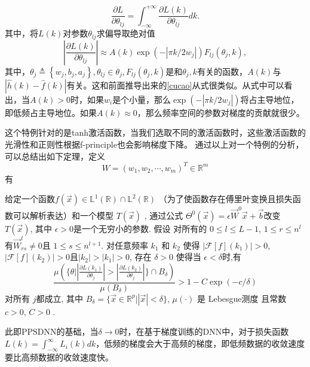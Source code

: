 \begin{equation}
    \frac{\partial L}{\partial\theta_{lj}}=\int_{-\infty}^{+\infty}\frac{\partial L(k)}{\partial\theta_{lj}}dk.\label{eq:GDfreq}
\end{equation}
其中，将$L(k)$对参数$\theta_{lj}$求偏导取绝对值
\begin{equation}
    \left|\frac{\partial L(k)}{\partial\theta_{lj}}\right|\approx A(k)\exp\left(-|\pi k/2w_{j}|\right)F_{lj}(\theta_{j},k),\label{eq:DL2}
\end{equation}
其中，$\theta_{j} \triangleq\left\{w_{j}, b_{j}, a_{j}\right\}, \theta_{l j} \in \theta_{j}, F_{l j}\left(\theta_{j}, k\right)$是和$\theta_{j}, k$有关的函数，$A(k)$与$|\hat{h}(k)-\hat{f}(k)|$有关。这和前面推导出来的\ref{cucao}从式很类似。从式中可以看出，当$A(k)>0$时，如果$w_{i}$是个小量，那么$\exp\left(-|\pi k/2w_{j}|\right)$将占主导地位，即低频占主导地位。如果$A(k)\approx 0$，那么频率空间的参数对梯度的贡献就很少。

这个特例针对的是tanh激活函数，当我们选取不同的激活函数时，这些激活函数的光滑性和正则性根据f-principle也会影响梯度下降。
通过以上对一个特例的分析，可以总结出如下定理，定义
\begin{equation}
    W=\left(w_{1}, w_{2}, \cdots, w_{m}\right)^{T} \in \mathbb{R}^{m}
\end{equation}
有
\begin{thm}
给定一个函数$f(\vec{x})\in\mathbb{L}^{1}(\mathbb{R})\cap\mathbb{L}%
^{2}(\mathbb{R})$ （为了使函数存在傅里叶变换且损失函数可以解析表达）和一个模型 $T(\vec{x})$ , 通过公式 $\Theta^{0}(\vec{x})=\epsilon
\vec{W}^{0}\vec{x}+\vec{b}$改变 $T(\vec{x})$, 其中 $\epsilon>0$是一个无穷小的参数. 假设
 对所有的 $0\leqslant l\leqslant L-1$, $1\leqslant
r\leqslant n^{l}$ 有$\vec{W}_{rs}^{l}\neq0$且 $1\leqslant s\leqslant n^{l+1}$. 对任意频率  
$k_{1}$ 和 $k_{2}$ 使得 $\left|  \mathcal{F}[f](k_{1}) \right|  >0$,
$\left|  \mathcal{F}[f](k_{2}) \right|  >0$且$\left|  k_{2} \right|
>\left|  k_{1} \right|  >0$, 存在 $\delta>0$ 使得当
$\epsilon<\delta$时,有
\[
\frac{\mu\left(  \{\theta|\left|  \frac{\partial L(k_{1})}{\partial\theta_{j}}
\right|  >\left|  \frac{\partial L(k_{2})}{\partial\theta_{j}} \right|  \}\cap
B_{\delta}\right)  }{\mu(B_{\delta})}>1-C\exp(-c/\delta)
\]
对所有 $j$都成立, 其中 $B_{\delta}=\{\vec{x}\in\mathbb{R}^{p}|\left|
\vec{x} \right|  <\delta\}$, $\mu(\cdot)$ 是 Lebesgue测度 且常数 $c>0$,
$C>0$ .
\end{thm}

此即PPSDNN的基础，当$\delta \rightarrow 0$时，在基于梯度训练的DNN中，对于损失函数$L(k) = \int_{-\infty }^{\infty } L_i(k)dk$，低频的梯度会大于高频的梯度，即低频数据的收敛速度要比高频数据的收敛速度快。

